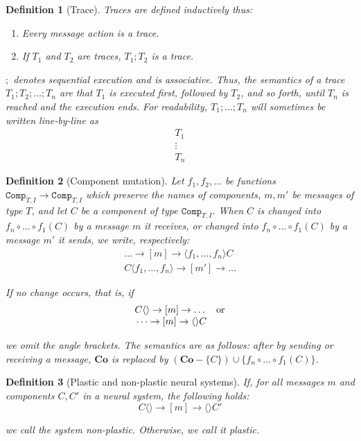 \documentclass[]{scrartcl}
\theoremstyle{break}
\newtheorem{definition}{Definition}
\newcommand{\mt}[1]{\textnormal{#1}}
\renewcommand{\tt}[1]{\texttt{#1}}
\newcommand{\co}{\mathbf{Co}}
\newcommand{\compT}[2]{\tt{Comp}_{#1,#2}}
\begin{document}
\begin{definition}[Trace]
	Traces are defined inductively thus:
		\begin{enumerate}
			\item Every message action is a trace.
			\item If $T_1$ and $T_2$ are traces, $T_1;T_2$ is a trace.
		\end{enumerate}
		
	$;$ denotes sequential execution and is associative. Thus, the semantics of a trace $T_1;T_2;\dots;T_n$ are that $T_1$ is executed first, followed by $T_2$, and so forth, until $T_n$ is reached and the execution ends.
	For readability, $T_1;\dots;T_n$ will sometimes be written line-by-line as
	$$
		\begin{array}{l}
		T_1\\
		\vdots\\
		T_n
		\end{array}
	$$
\end{definition}

\begin{definition}[Component mutation]
	Let $f_1,f_2,\dots$ be functions $\compT{T}{I} \rightarrow \compT{T}{I}$ which preserve the names of components, $m,m'$ be messages of type $T$, and let $C$ be a component of type $\compT{T}{I}$. When $C$ is changed into $f_n \circ \dots \circ f_1 (C)$ by a message $m$ it receives, or changed into $f_n \circ \dots \circ f_1 (C)$ by a message $m'$ it sends, we write, respectively:
	$$
		\begin{array}{c}
			\dots \rightarrow [m] \rightarrow \langle f_1,\dots,f_n \rangle C\\
			C\langle f_1,\dots,f_n \rangle \rightarrow [m'] \rightarrow \dots
		\end{array}
	$$
	
	\noindent
	If no change occurs, that is, if
	$$
		\begin{array}{r l}
			C\langle\rangle \rightarrow [m] \rightarrow \dots & \mt{or}\\
			\dots \rightarrow [m] \rightarrow \langle\rangle C
		\end{array}
	$$
	
	\noindent
	we omit the angle brackets.
	The semantics are as follows: after by sending or receiving a message, $\co$ is replaced by $(\co - \{C\}) \cup \{f_n \circ \dots \circ f_1 (C) \}$.
\end{definition}

\begin{shaded}
\begin{definition}[Plastic and non-plastic neural systems]
	If, for all messages $m$ and components $C, C'$ in a neural system, the following holds:
	$$
		C\langle\rangle \rightarrow [m] \rightarrow \langle\rangle C'
	$$
	
	\noindent
	we call the system non-plastic. Otherwise, we call it plastic.
\end{definition}
\end{shaded}
\end{document}
